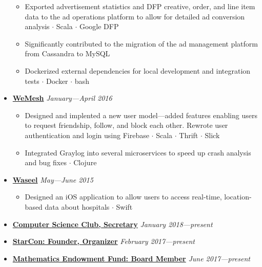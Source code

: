 \documentclass[5pt,letterpaper]{article}
\newcommand{\dt}{$\cdot$ }
\begin{document}
\begin{itemize}[leftmargin=1em, noitemsep]
    \begin{itemize}[label=\textbullet, noitemsep, nosep]
      \item Exported advertisement statistics and DFP creative, order, and line
        item data to the ad operations platform to allow for detailed ad
        conversion analysis \dt Scala \dt Google DFP
      \item Significantly contributed to the migration of the ad
        management platform from Cassandra to MySQL
      \item Dockerized external dependencies for local development and
        integration tests \dt Docker \dt bash
    \end{itemize}

  \item[]
    {\href{http://www.rave.io}{\textbf{WeMesh}} \hfill
    \emph{January---April 2016}}

    \begin{itemize}[label=\textbullet, noitemsep, nosep]
      \item Designed and implented a new user model---added features enabling
        users to request friendship, follow, and block each other. Rewrote user
        authentication and login using Firebase \dt Scala \dt Thrift \dt Slick
      \item Integrated Graylog into several microservices to speed up crash
        analysis and bug fixes \dt Clojure
    \end{itemize}

  \item[]
    {\href{https://www.waseel.com}{\textbf{Waseel}} \hfill
    \emph{May---June 2015}}

    \begin{itemize}[label=\textbullet, noitemsep]
      \item Designed an iOS application to allow users to access real-time,
        location-based data about hospitals \dt Swift
    \end{itemize}

  \item[]
    {\href{https://csclub.uwaterloo.ca}{\textbf{Computer Science Club, Secretary}} \hfill
    \emph{January 2018---present}}

  \item[]
    {\href{https://starcon.io}{\textbf{StarCon: Founder, Organizer}} \hfill
    \emph{February 2017---present}}

  \item[]
    {\href{https://uwaterloo.ca/math-endowment-fund/}{\textbf{Mathematics
    Endowment Fund: Board Member}} \hfill \emph{June 2017---present}}


\end{itemize}
\end{document}
